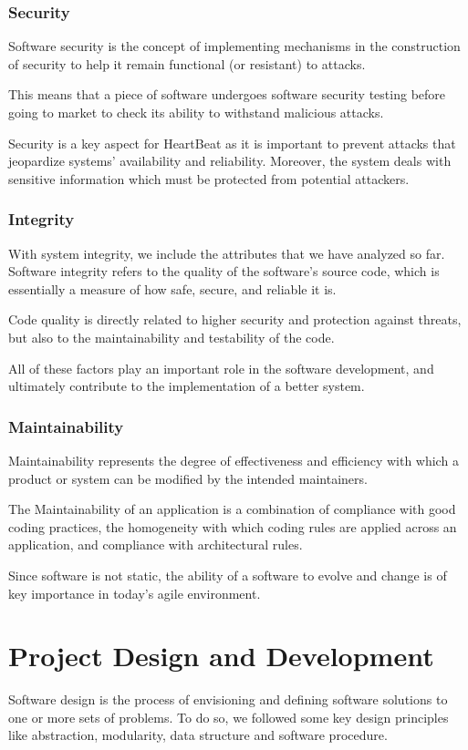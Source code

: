 \documentclass[11pt,a4paper]{article}
\begin{document}
\subsubsection{Security}
Software security is the concept of implementing mechanisms in the construction of security to help it remain functional (or resistant) to attacks. 

This means that a piece of software undergoes software security testing before going to market to check its ability to withstand malicious attacks.

Security is a key aspect for HeartBeat as it is important to prevent attacks that jeopardize systems' availability and reliability.
%
Moreover, the system deals with sensitive information which must be protected from potential attackers.

\subsubsection{Integrity}
With system integrity, we include the attributes that we have analyzed so far.
%
Software integrity refers to the quality of the software’s source code, which is essentially a measure of how safe, secure, and reliable it is.

Code quality is directly related to higher security and protection against threats, but also to the maintainability and testability of the code. 

All of these factors play an important role in the software development, and ultimately contribute to the implementation of a better system. 

\subsubsection{Maintainability}
Maintainability represents the degree of effectiveness and efficiency with which a product or system can be modified by the intended maintainers. 

The Maintainability of an application is a combination of compliance with good coding practices, the homogeneity with which coding rules are applied across an application, and compliance with architectural rules.

Since software is not static, the ability of a software to evolve and change is of key importance in today's agile environment.

\section{Project Design and Development}
Software design is the process of envisioning and defining software solutions to one or more sets of problems.
%
To do so, we followed some key design principles like abstraction, modularity, data structure and software procedure.
\end{document}
